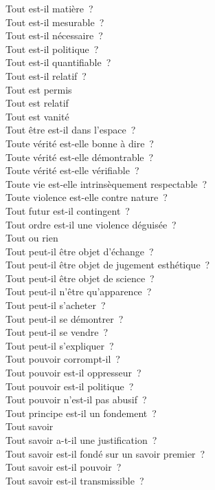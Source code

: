 \documentclass[a4paper,12pt]{article}
\begin{document}
Tout est-il matière ? \\
Tout est-il mesurable ? \\
Tout est-il nécessaire ? \\
Tout est-il politique ? \\
Tout est-il quantifiable ? \\
Tout est-il relatif ? \\
Tout est permis \\
Tout est relatif \\
Tout est vanité \\
Tout être est-il dans l'espace ? \\
Toute vérité est-elle bonne à dire ? \\
Toute vérité est-elle démontrable ? \\
Toute vérité est-elle vérifiable ? \\
Toute vie est-elle intrinsèquement respectable ? \\
Toute violence est-elle contre nature ? \\
Tout futur est-il contingent ? \\
Tout ordre est-il une violence déguisée ? \\
Tout ou rien \\
Tout peut-il être objet d'échange ? \\
Tout peut-il être objet de jugement esthétique ? \\
Tout peut-il être objet de science ? \\
Tout peut-il n'être qu'apparence ? \\
Tout peut-il s'acheter ? \\
Tout peut-il se démontrer ? \\
Tout peut-il se vendre ? \\
Tout peut-il s'expliquer ? \\
Tout pouvoir corrompt-il ? \\
Tout pouvoir est-il oppresseur ? \\
Tout pouvoir est-il politique ? \\
Tout pouvoir n'est-il pas abusif ? \\
Tout principe est-il un fondement ? \\
Tout savoir \\
Tout savoir a-t-il une justification ? \\
Tout savoir est-il fondé sur un savoir premier ? \\
Tout savoir est-il pouvoir ? \\
Tout savoir est-il transmissible ? \\
\end{document}
